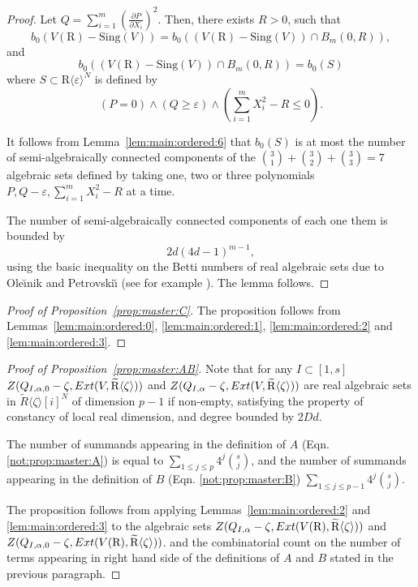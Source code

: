 \documentclass[10pt]{amsart}
\theoremstyle{definition}
\theoremstyle{remark}
\numberwithin{equation}{section}
\newcommand {\R} {\mathrm{R}}
\newcommand {\ZZ} {{\rm Z}}
\newcommand {\la}   {{\langle}}
\newcommand {\ra}   {{\rangle}}
\newcommand {\eps} {{\varepsilon}}
\newcommand {\E} {{\rm Ext}}
\newcommand{\Sing}{\mathrm{Sing}}
\begin{document}
\begin{proof}
    Let $Q = \sum_{i=1}^m \left(\frac{\partial P}{\partial X_i}\right)^2$. Then, there exists $R > 0$, such that 
    \[
    b_0(V(\R) - \Sing(V)) = b_0((V(\R) - \Sing(V)) \cap B_m(0,R)),
    \]
    and
    \[
     b_0((V(\R) - \Sing(V)) \cap B_m(0,R)) = b_0(S)   
    \]
    where $S \subset \R\la\eps\ra^N$ is defined by 
    \[
    (P = 0) \wedge  (Q \geq \eps) \wedge (\sum_{i=1}^m X_i^2 -R \leq 0).
    \]

    It follows from Lemma~\ref{lem:main:ordered:6} that $b_0(S)$ is at most 
    the number of semi-algebraically connected components of
    the  $\binom{3}{1} + \binom{3}{2} + \binom{3}{3} = 7$
    algebraic sets
    defined by taking one, two or three polynomials 
    $P,Q - \eps, \sum_{i=1}^m X_i^2 -R$ at a time. 
    
    The number of semi-algebraically connected components of each one them is bounded by 
    \[
    2d(4d -1)^{m-1},
    \]
    using the basic inequality on the Betti numbers of real algebraic sets due to Ole{\u\i}nik and Petrovski{\u\i} \cite{OP}
    (see for example \cite[Proposition 7.28]{BPRbook2}).
    The lemma follows.
\end{proof}

\begin{proof}[Proof of Proposition~\ref{prop:master:C}]
    The proposition follows from Lemmas~\ref{lem:main:ordered:0}, 
    \ref{lem:main:ordered:1}, \ref{lem:main:ordered:2} and \ref{lem:main:ordered:3}. 
\end{proof}

\begin{proof}[Proof of Proposition~\ref{prop:master:AB}]
Note that for any $I \subset [1,s]$
$\ZZ(Q_{I,\alpha,0} - \zeta, \E(V,\widetilde{\R}\la\zeta\ra))$ and
$\ZZ(Q_{I,\alpha} -  \zeta, \E(V,\widetilde{\R}\la\zeta\ra))$ 
are real algebraic sets in  $\widetilde{R}\la\zeta\ra[i]^N$ of dimension $p - 1$ if non-empty,
satisfying the property of constancy of local real dimension, and
degree bounded by $2 D d$.


The number of summands appearing in the definition of 
$A$
(Eqn. \eqref{not:prop:master:A}) is equal to 
$\sum_{1 \leq j \leq p} 4^j \binom{s}{j}$, and the 
number of summands appearing in the definition of  
$B$
(Eqn. \eqref{not:prop:master:B})
$\sum_{1 \leq j \leq p-1}4^j \binom{s}{j}$.

  The proposition follows from applying Lemmas~\ref{lem:main:ordered:2} and \ref{lem:main:ordered:3} to the algebraic sets 
$\ZZ(Q_{I,\alpha} -  \zeta, \E(V(\R),\widetilde{\R}\la\zeta\ra))$ and
$\ZZ(Q_{I,\alpha,0} - \zeta, \E(V(\R),\widetilde{\R}\la\zeta\ra))$.
and the combinatorial count on the number of terms appearing in right hand side of the definitions of 
$A$ and $B$
stated in the previous paragraph.
\end{proof}
\end{document}

